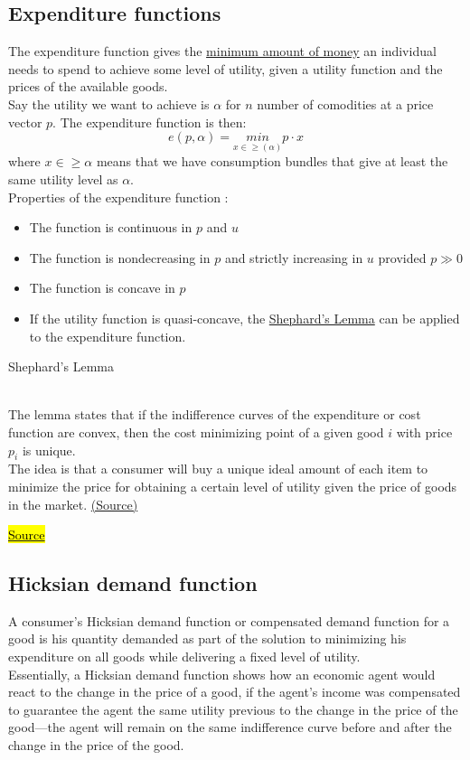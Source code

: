 \documentclass[a4paper, 12pt, reqno]{article}
\begin{document}
\subsection{Expenditure functions}
The expenditure function gives the \underline{minimum amount of money} an individual needs to spend to achieve some level of utility, given a utility function and the prices of the available goods. \\
Say the utility we want to achieve is $\alpha$ for $n$ number of comodities at a price vector $p$. The expenditure function is then:
$$ e(p, \alpha) = \underset{x \in \geq (\alpha)}{min} p \cdot x$$
where $ x \in \geq \alpha$ means that we have consumption bundles that give at least the same utility level as $\alpha$. \\
Properties of the expenditure function :
\begin{itemize}
    \item The function is continuous in $p$ and $u$ 
    \item The function is nondecreasing in $p$ and strictly increasing in $u$ provided $p \gg 0$ 
    \item The function is concave in $p$
    \item If the utility function is quasi-concave, the \hyperlink{thesentence}{Shephard's Lemma} can be applied to the expenditure function. 
\end{itemize}

\begin{tcolorbox}
    \hypertarget{thesentence}{Shephard's Lemma} \\
    The lemma states that if the indifference curves of the expenditure or cost function are convex, then the cost minimizing point of a given good $i$ with price $p_i$ is unique. \\ The idea is that a consumer will 
    buy a unique ideal amount of each item to minimize the price for obtaining a certain level of utility given the price of goods in the market. \href{https://en.wikipedia.org/wiki/Shephard%27s_lemma}{(Source)}
\end{tcolorbox}
    
\href{https://en.wikipedia.org/wiki/Expenditure_function}{\hl{Source}}

\subsection{Hicksian demand function}
A consumer's Hicksian demand function or compensated demand function for a good is his quantity demanded as part of the solution to minimizing his expenditure on all goods while delivering a fixed level of utility. \\ Essentially, a Hicksian demand function shows how an 
economic agent would react to the change in the 
price of a good, if the agent's income was compensated to guarantee the agent the same utility previous to the change in the price of the good—the agent will remain on the same indifference curve before and after the change in the price of the good.
\end{document}
